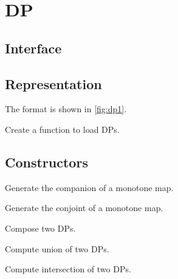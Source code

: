 \section{DP}

\label{sec:exercises-DP}

\subsection*{Interface}

\subsection*{Representation}


The format is shown in \cref{fig:dp1}.


\begin{exercise}
Create a function to load DPs.
%
\end{exercise}

\subsection*{Constructors}


\begin{exercise}
Generate the companion of a monotone map.
%
\end{exercise}

\begin{exercise}
Generate the conjoint of a monotone map.
%
%
\end{exercise}





\begin{exercise}
Compose two DPs.
%
\end{exercise}

\begin{exercise}
Compute union of two DPs.
%
\end{exercise}

\begin{exercise}
Compute intersection of two DPs.
%
\end{exercise}


